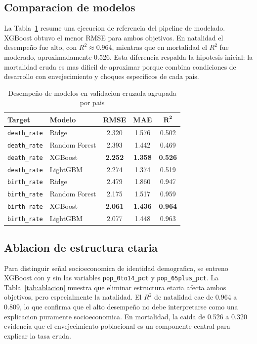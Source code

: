 \documentclass[conference]{IEEEtran}
\begin{document}
\subsection{Comparacion de modelos}

La Tabla~\ref{tab:modelos} resume una ejecucion de referencia del pipeline de modelado. XGBoost obtuvo el menor RMSE para ambos objetivos. En natalidad el desempeño fue alto, con \(R^2 \approx 0.964\), mientras que en mortalidad el \(R^2\) fue moderado, aproximadamente 0.526. Esta diferencia respalda la hipotesis inicial: la mortalidad cruda es mas dificil de aproximar porque combina condiciones de desarrollo con envejecimiento y choques especificos de cada pais.

\begin{table}[htbp]
\caption{Desempeño de modelos en validacion cruzada agrupada por pais}
\label{tab:modelos}
\centering
\begin{tabular}{llccc}
\toprule
\textbf{Target} & \textbf{Modelo} & \textbf{RMSE} & \textbf{MAE} & \(\mathbf{R^2}\) \\
\midrule
\texttt{death\_rate} & Ridge & 2.320 & 1.576 & 0.502 \\
\texttt{death\_rate} & Random Forest & 2.393 & 1.442 & 0.469 \\
\texttt{death\_rate} & XGBoost & \textbf{2.252} & \textbf{1.358} & \textbf{0.526} \\
\texttt{death\_rate} & LightGBM & 2.274 & 1.374 & 0.519 \\
\midrule
\texttt{birth\_rate} & Ridge & 2.479 & 1.860 & 0.947 \\
\texttt{birth\_rate} & Random Forest & 2.175 & 1.517 & 0.959 \\
\texttt{birth\_rate} & XGBoost & \textbf{2.061} & \textbf{1.436} & \textbf{0.964} \\
\texttt{birth\_rate} & LightGBM & 2.077 & 1.448 & 0.963 \\
\bottomrule
\end{tabular}
\end{table}

\subsection{Ablacion de estructura etaria}

Para distinguir señal socioeconomica de identidad demografica, se entreno XGBoost con y sin las variables \texttt{pop\_0to14\_pct} y \texttt{pop\_65plus\_pct}. La Tabla~\ref{tab:ablacion} muestra que eliminar estructura etaria afecta ambos objetivos, pero especialmente la natalidad. El \(R^2\) de natalidad cae de 0.964 a 0.809, lo que confirma que el alto desempeño no debe interpretarse como una explicacion puramente socioeconomica. En mortalidad, la caida de 0.526 a 0.320 evidencia que el envejecimiento poblacional es un componente central para explicar la tasa cruda.
\end{document}
